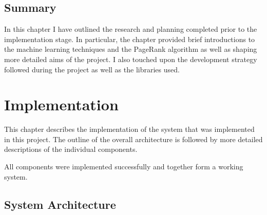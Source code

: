 \documentclass[12pt,notitlepage,twoside]{scrreprt}
\begin{document}
\section{Summary}
In this chapter I have outlined the research and planning completed prior to the
implementation stage. In particular, the chapter provided brief introductions to the machine
learning techniques and the PageRank algorithm as well as shaping more detailed aims of
the project. I also touched upon the development strategy followed during the project as
well as the libraries used.

\cleardoublepage

\chapter{Implementation}
This chapter describes the implementation of the system that was implemented in this
project. The outline of the overall architecture is followed by more detailed descriptions
of the individual components.

All components were implemented successfully and together form a working system.
\section{System Architecture}
\end{document}
